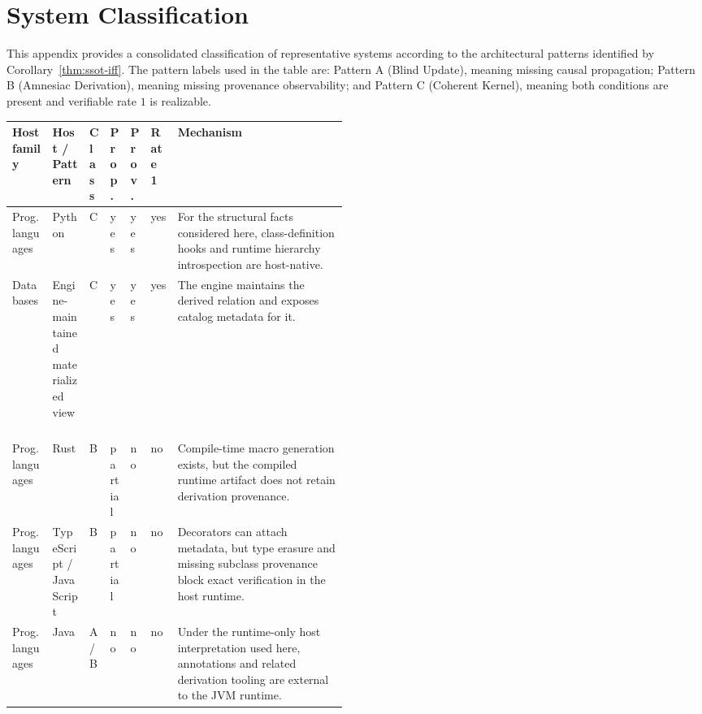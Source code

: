 \section{System Classification}\label{sec:appendix-classification}

This appendix provides a consolidated classification of representative systems according to the architectural patterns identified by Corollary~\ref{thm:ssot-iff}. The pattern labels used in the table are: Pattern A (Blind Update), meaning missing causal propagation; Pattern B (Amnesiac Derivation), meaning missing provenance observability; and Pattern C (Coherent Kernel), meaning both conditions are present and verifiable rate $1$ is realizable.

\begingroup
\centering
\scriptsize
\setlength{\tabcolsep}{2pt}
\renewcommand{\arraystretch}{1.18}
\begin{tabularx}{\linewidth}{@{}>{\RaggedRight\arraybackslash}p{0.12\linewidth}>{\RaggedRight\arraybackslash}p{0.11\linewidth}>{\centering\arraybackslash}p{0.06\linewidth}>{\centering\arraybackslash}p{0.055\linewidth}>{\centering\arraybackslash}p{0.055\linewidth}>{\centering\arraybackslash}p{0.08\linewidth}X@{}}
\toprule
\textbf{Host family} & \textbf{Host / Pattern} & \textbf{Class} & \textbf{Prop.} & \textbf{Prov.} & \textbf{Rate 1} & \textbf{Mechanism} \\
\midrule
Prog. languages & Python~\cite{pep487,pythondatamodel2025} & C & yes & yes & yes & For the structural facts considered here, class-definition hooks and runtime hierarchy introspection are host-native. \\
Databases & Engine-maintained materialized view~\cite{postgresMaterializedViews2025,postgresPgMatviews2025} & C & yes & yes & yes & The engine maintains the derived relation and exposes catalog metadata for it. \\
Prog. languages & Rust~\cite{rustref2024} & B & partial & no & no & Compile-time macro generation exists, but the compiled runtime artifact does not retain derivation provenance. \\
Prog. languages & TypeScript / JavaScript~\cite{typescriptDecorators2025,javascriptDecorators2025} & B & partial & no & no & Decorators can attach metadata, but type erasure and missing subclass provenance block exact verification in the host runtime. \\
Prog. languages & Java~\cite{gosling2021java} & A/B & no & no & no & Under the runtime-only host interpretation used here, annotations and related derivation tooling are external to the JVM runtime. \\

\end{tabularx}
